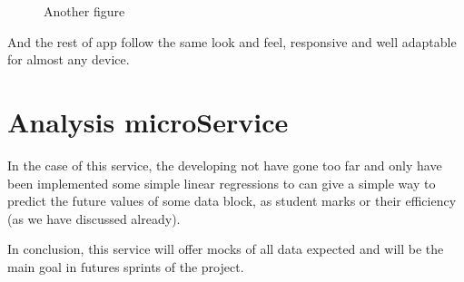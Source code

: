 \begin{figure}[H]
\begin{minipage}{.5\textwidth}
  \caption{Another figure}
\end{minipage}
\end{figure}

\noindent And the rest of app follow the same look and feel, responsive and well adaptable
for almost any device.

\section{Analysis microService}

In the case of this service, the developing not have gone too far and only have
been implemented some simple linear regressions to can give a simple way to
predict the future values of some data block, as student marks or their efficiency
(as we have discussed already).

In conclusion, this service will offer mocks of all data expected and will be
the main goal in futures sprints of the project.
